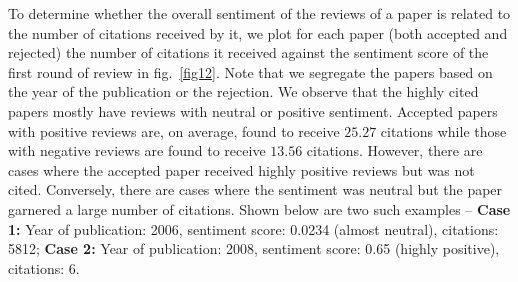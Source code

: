 To determine whether the overall sentiment of the reviews of a paper is related to the number of citations received by it, we plot for each paper (both accepted and rejected) the number of citations it received against the  sentiment score of the first round of review in fig.~\ref{fig12}. Note that we segregate the papers based on the year of the publication or the rejection. We observe that the highly cited papers mostly have reviews with neutral or positive sentiment. Accepted papers with positive reviews are, on average, found to receive $25.27$ citations while those with negative reviews are found to receive $13.56$ citations.
However, there are cases where the accepted paper received highly positive reviews but was not cited. Conversely, there are cases where the sentiment was neutral but the paper garnered a large number of citations. Shown below are two such examples -- {\bf Case 1:} Year of publication: 2006, sentiment score: 0.0234 (almost neutral), citations: 5812; {\bf Case 2:} Year of publication: 2008, sentiment score: 0.65 (highly positive), citations: 6.
